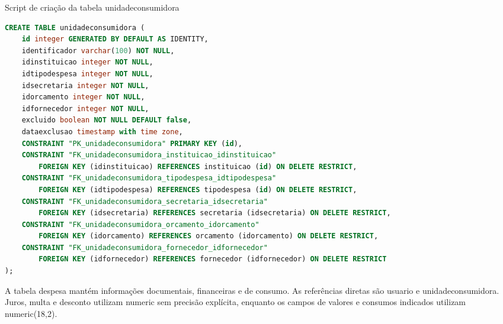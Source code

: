 \begin{quadro}[H]
\caption{Script de criação da tabela unidadeconsumidora}\label{qua:bd-unidadeconsumidora}
\begin{lstlisting}[language=SQL,breaklines=true,breakatwhitespace=false,frame=single,columns=fullflexible,basicstyle=\ttfamily\footnotesize]
CREATE TABLE unidadeconsumidora (
    id integer GENERATED BY DEFAULT AS IDENTITY,
    identificador varchar(100) NOT NULL,
    idinstituicao integer NOT NULL,
    idtipodespesa integer NOT NULL,
    idsecretaria integer NOT NULL,
    idorcamento integer NOT NULL,
    idfornecedor integer NOT NULL,
    excluido boolean NOT NULL DEFAULT false,
    dataexclusao timestamp with time zone,
    CONSTRAINT "PK_unidadeconsumidora" PRIMARY KEY (id),
    CONSTRAINT "FK_unidadeconsumidora_instituicao_idinstituicao"
        FOREIGN KEY (idinstituicao) REFERENCES instituicao (id) ON DELETE RESTRICT,
    CONSTRAINT "FK_unidadeconsumidora_tipodespesa_idtipodespesa"
        FOREIGN KEY (idtipodespesa) REFERENCES tipodespesa (id) ON DELETE RESTRICT,
    CONSTRAINT "FK_unidadeconsumidora_secretaria_idsecretaria"
        FOREIGN KEY (idsecretaria) REFERENCES secretaria (idsecretaria) ON DELETE RESTRICT,
    CONSTRAINT "FK_unidadeconsumidora_orcamento_idorcamento"
        FOREIGN KEY (idorcamento) REFERENCES orcamento (idorcamento) ON DELETE RESTRICT,
    CONSTRAINT "FK_unidadeconsumidora_fornecedor_idfornecedor"
        FOREIGN KEY (idfornecedor) REFERENCES fornecedor (idfornecedor) ON DELETE RESTRICT
);
\end{lstlisting}
\end{quadro}

A tabela despesa mantém informações documentais, financeiras e de consumo. As referências diretas são usuario e unidadeconsumidora. Juros, multa e desconto utilizam numeric sem precisão explícita, enquanto os campos de valores e consumos indicados utilizam numeric(18,2).

